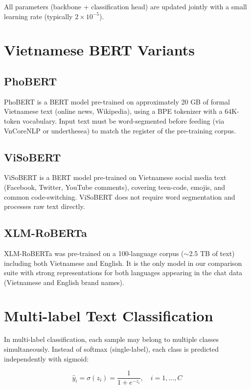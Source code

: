 \documentclass[12pt, a4paper]{report}
\begin{document}
All parameters (backbone + classification head) are updated jointly
with a small learning rate (typically $2 \times 10^{-5}$).

\section{Vietnamese BERT Variants}

\subsection{PhoBERT}

PhoBERT \cite{nguyen2020phobert} is a BERT model pre-trained on approximately
20 GB of formal Vietnamese text (online news, Wikipedia),
using a BPE tokenizer with a 64K-token vocabulary.
Input text must be word-segmented before feeding (via VnCoreNLP or underthesea)
to match the register of the pre-training corpus.

\subsection{ViSoBERT}

ViSoBERT \cite{visobert2023} is a BERT model pre-trained on Vietnamese social media text
(Facebook, Twitter, YouTube comments),
covering teen-code, emojis, and common code-switching.
ViSoBERT does not require word segmentation and processes raw text directly.

\subsection{XLM-RoBERTa}

XLM-RoBERTa \cite{conneau2020xlmr} was pre-trained on a 100-language corpus
($\sim$2.5 TB of text) including both Vietnamese and English.
It is the only model in our comparison suite with strong representations
for both languages appearing in the chat data
(Vietnamese and English brand names).

\section{Multi-label Text Classification}

In multi-label classification, each sample may belong to multiple classes simultaneously.
Instead of softmax (single-label), each class is predicted independently with sigmoid:

\begin{equation}
  \hat{y}_i = \sigma(z_i) = \frac{1}{1 + e^{-z_i}}, \quad i = 1,\ldots,C
\end{equation}
\end{document}
